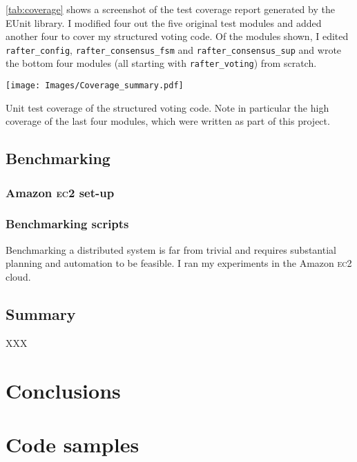 \documentclass[draft,11pt,chapterprefix=true,toc=bibliography,numbers=noendperiod,
               footnotes=multiple,twoside]{scrreprt}
\newcommand{\ECC}[0]{\textsc{ec}2 }
\begin{document}
\autoref{tab:coverage} shows a screenshot of the test coverage report generated by the EUnit library. I modified four out the five original test modules and added another four to cover my structured voting code. Of the modules shown, I edited \texttt{rafter\_config}, \texttt{rafter\_consensus\_fsm} and \texttt{rafter\_consensus\_sup} and wrote the bottom four modules (all starting with \texttt{rafter\_voting}) from scratch.

\begin{table}[h]
    \centering
    \texttt{[image: Images/Coverage\_summary.pdf]}
    \caption[Unit test coverage]{Unit test coverage of the structured voting code. Note in particular the high coverage of the last four modules, which were written as part of this project.}
    \label{tab:coverage}
\end{table}

\section{Benchmarking}

\subsection{Amazon \ECC set-up}

\subsection{Benchmarking scripts}

Benchmarking a distributed system is far from trivial and requires substantial planning and automation to be feasible. I ran my experiments in the Amazon \ECC cloud.

\section{Summary}

XXX

\chapter{Conclusions\label{ch:conclusions}}



\printbibliography


\appendix

\chapter{Code samples\label{ch:code-samples}}

%
%

\end{document}
